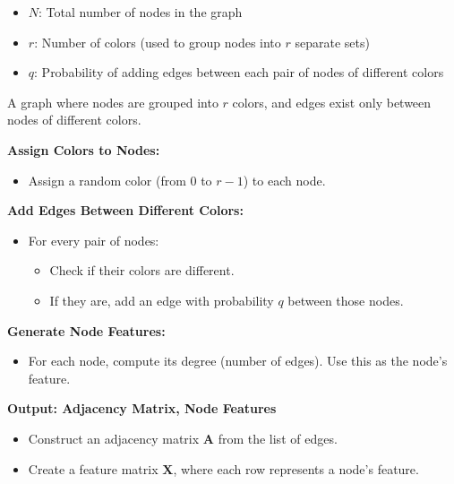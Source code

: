 \begin{algorithm}
\caption{Generating a $r$-Colorable Graph}
\label{alg:r-colorable}
\begin{algorithmic}[1]
    \Require 
        \begin{itemize}
            \item $N$: Total number of nodes in the graph
            \item $r$: Number of colors (used to group nodes into $r$ separate sets)
            \item $q$: Probability of adding edges between each pair of nodes of different colors
        \end{itemize}
    \Ensure A graph where nodes are grouped into $r$ colors, and edges exist only between nodes of different colors.

    \State \textbf{Assign Colors to Nodes:}
        \begin{itemize}
            \item Assign a random color (from $0$ to $r-1$) to each node.
        \end{itemize}

    \State \textbf{Add Edges Between Different Colors:}
        \begin{itemize}
            \item For every pair of nodes:
            \begin{itemize}
                \item Check if their colors are different.
                \item If they are, add an edge with probability $q$ between those nodes.
            \end{itemize}
        \end{itemize}

    \State \textbf{Generate Node Features:}
        \begin{itemize}
            \item For each node, compute its degree (number of edges). Use this as the node's feature.
        \end{itemize}

    \State \textbf{Output: Adjacency Matrix, Node Features}
        \begin{itemize}
            \item Construct an adjacency matrix $\mathbf{A}$ from the list of edges.
            \item Create a feature matrix $\mathbf{X}$, where each row represents a node's feature.
        \end{itemize}

\end{algorithmic}
\end{algorithm}



